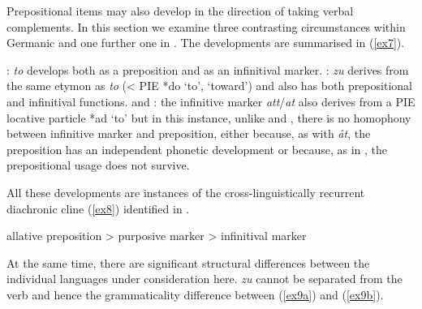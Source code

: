 \documentclass[output=paper]{langsci/langscibook}
\begin{document}
Prepositional items may also develop in the direction of taking verbal
complements. In this section we examine three contrasting circumstances within
Germanic and one further one in . The  developments are
summarised in (\ref{ex7}).

\begin{exe}
\ex\label{ex7}
\begin{xlist}
\ex\label{ex7a}
: \emph{to} develops both as a preposition and as an infinitival marker.
\ex\label{ex7b}
: \emph{zu} derives from the same etymon as  \emph{to}
(< PIE *do `to', `toward') and also has both prepositional and infinitival functions.
\ex\label{ex7c}
 and : the infinitive marker \emph{att}/\emph{at} also derives from a PIE locative particle *ad `to' but in this instance, unlike  and , there is no homophony between infinitive marker and preposition, either because, as with  \emph{\aa t},  the preposition has an independent phonetic development or because, as in , the prepositional usage does not survive.
\end{xlist}
\end{exe}

All these developments are instances of the cross-linguistically recurrent
diachronic cline (\ref{ex8}) identified in \cite{Haspelmath89}.

\begin{exe}
\ex\label{ex8}
allative preposition > purposive marker > infinitival marker
\end{exe}

At the same time, there are significant structural differences between the
individual  languages under consideration here.  \emph{zu}
cannot be separated from the verb and hence the grammaticality difference
between (\ref{ex9a}) and (\ref{ex9b}).

\begin{exe}
\ex\label{ex9} 
\begin{xlist}
\label{ex9a}
\label{ex9b}
\end{xlist}
\end{exe}
\end{document}
